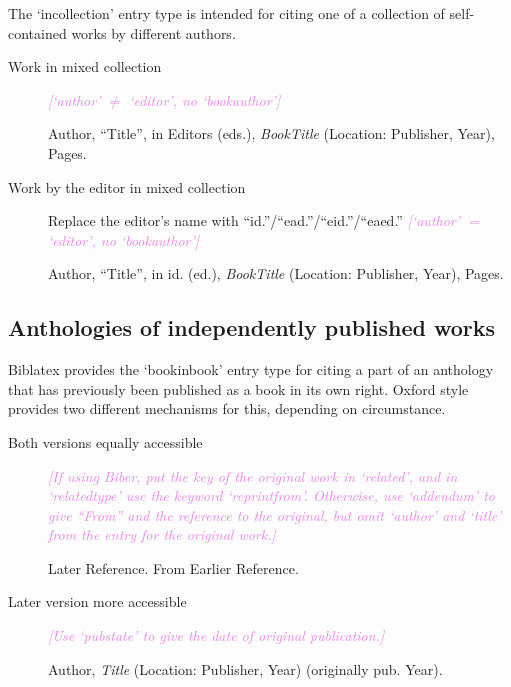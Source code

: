 \documentclass[extrafontsizes,11pt,a4paper,oneside]{memoir}
\newcommand*{\lit}[1]{\textsf{#1}}
\newcommand*{\code}[1]{`\textsf{#1}'}
\newcommand*{\aside}[1]{\textcolor{violet}{\emph{[#1]}}}
\begin{document}
    The \code{incollection} entry type is intended for citing one of a collection of self-contained works by different authors.
    
    \begin{description}
        \item[Work in mixed collection] \aside{\code{author} $\neq$ \code{editor}, no \code{bookauthor}}
        \par Author, \enquote{Title}, \lit{in} Editors (\lit{eds.}), \emph{BookTitle} (Location: Publisher, Year), Pages.
        \\
        
        \item[Work by the editor in mixed collection] Replace the editor's name with \enquote{id.}\slash \enquote{ead.}\slash \enquote{eid.}\slash \enquote{eaed.} \aside{\code{author} $=$ \code{editor}, no \code{bookauthor}}
        \par Author, \enquote{Title}, \lit{in id.} (\lit{ed.}), \emph{BookTitle} (Location: Publisher, Year), Pages.
        \\
        
    \end{description}
    
    \subsection{Anthologies of independently published works}
    
    Biblatex provides the \code{bookinbook} entry type for citing a part of an anthology that has previously been published as a book in its own right. Oxford style provides two different mechanisms for this, depending on circumstance.
    
    \begin{description}
        \item[Both versions equally accessible] \aside{If using Biber, put the key of the original work in \code{related}, and in \code{relatedtype} use the keyword \code{reprintfrom}. Otherwise, use \code{addendum} to give \enquote{From} and the reference to the original, but omit \code{author} and \code{title} from the entry for the original work.}\par
        Later Reference. From Earlier Reference.
        \\
        \item[Later version more accessible] \aside{Use \code{pubstate} to give the date of original publication.}\par
        \par Author, \emph{Title} (Location: Publisher, Year) (\lit{originally pub.} Year).
        \\
    \end{description}
    
\end{document}
